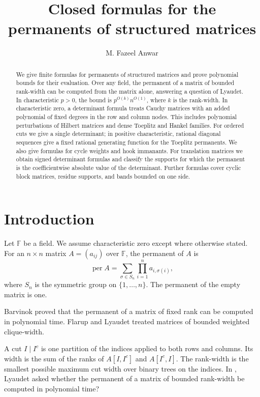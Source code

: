 \documentclass[11pt,reqno]{amsart}
\title[Closed formulas for permanents]{Closed formulas for the permanents of structured matrices}
\author{M. Fazeel Anwar}
\theoremstyle{remark}
\numberwithin{equation}{section}
\newcommand{\per}{\operatorname{per}}
\newcommand{\F}{\mathbb F}
\begin{document}
\raggedbottom

\begin{abstract}
We give finite formulas for permanents of structured matrices and
prove polynomial bounds for their evaluation. Over any field, the
permanent of a matrix of bounded rank-width can be computed from
the matrix alone, answering a question of Lyaudet. In characteristic
\(p>0\), the bound is \(p^{O(k)}n^{O(1)}\), where \(k\) is the
rank-width. In characteristic zero, a determinant formula treats
Cauchy matrices with an added polynomial of fixed degrees in the
row and column nodes. This includes polynomial perturbations of
Hilbert matrices and dense Toeplitz and Hankel families. For
ordered cuts we give a single determinant; in positive
characteristic, rational diagonal sequences give a fixed rational
generating function for the Toeplitz permanents. We also give
formulas for cycle weights and hook immanants. For translation
matrices we obtain signed determinant formulas and classify the
supports for which the permanent is the coefficientwise absolute
value of the determinant. Further formulas cover cyclic block
matrices, residue supports, and bands bounded on one side.
\end{abstract}
\maketitle

\section{Introduction}

Let \(\F\) be a field. We assume characteristic zero except where
otherwise stated. For an \(n\times n\)
matrix \(A=(a_{ij})\) over \(\F\), the permanent of \(A\) is
\[
 \per A=\sum_{\sigma\in S_n}\prod_{i=1}^n a_{i,\sigma(i)},
\]
where \(S_n\) is the symmetric group on \(\{1,\ldots,n\}\). The
permanent of the empty matrix is one.

Barvinok \cite{Barvinok} proved that the permanent of a matrix of
fixed rank can be computed in polynomial time. Flarup and Lyaudet
\cite{FlarupLyaudet} treated matrices of bounded weighted clique-width.

A cut \(I\mid I^c\) is one partition of the indices applied to
both rows and columns. Its width is the sum of the ranks of
\(A[I,I^c]\) and \(A[I^c,I]\). The rank-width is the smallest
possible maximum cut width over binary trees on the indices. In \cite[\S~4]{LyaudetRankWidth}, Lyaudet asked whether the permanent of a matrix of bounded rank-width be computed
in polynomial time?
\end{document}
